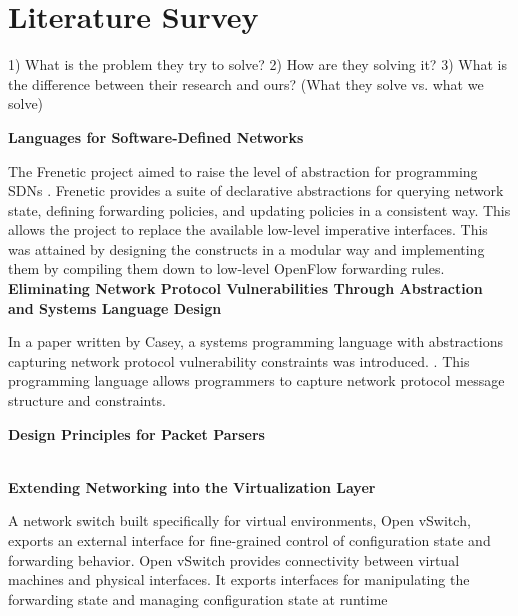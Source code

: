 
\section{Literature Survey}
1) What is the problem they try to solve?
2) How are they solving it?
3) What is the difference between their research and ours?  (What they solve vs. what we solve)

\textbf{Languages for Software-Defined Networks} 

The Frenetic project aimed to raise the level of abstraction for 
programming SDNs \cite{Foster2013}. Frenetic provides a suite of declarative abstractions 
for querying network state, defining forwarding policies, and updating 
policies in a consistent way. This allows the project to replace the 
available low-level imperative interfaces. This was attained by designing 
the constructs in a modular way and implementing them by compiling
them down to low-level OpenFlow forwarding rules. \\

\noindent \textbf{Eliminating Network Protocol Vulnerabilities Through Abstraction and Systems Language Design
}

In a paper written by Casey, a systems programming language with abstractions capturing network
protocol vulnerability constraints was introduced. \cite{Casey2013}. This programming language
allows programmers to capture network protocol message structure and constraints. 


\noindent \textbf{Design Principles for Packet Parsers}


\cite{Gibb2013} \\

\noindent \textbf{Extending Networking into the Virtualization Layer}

A network switch built specifically for virtual environments, Open vSwitch, exports an external interface
for fine-grained control of configuration state and forwarding behavior. Open vSwitch provides
connectivity between virtual machines and physical interfaces. It exports interfaces for manipulating
the forwarding state and managing configuration state at runtime  
\cite{Pfaff2009} \\

